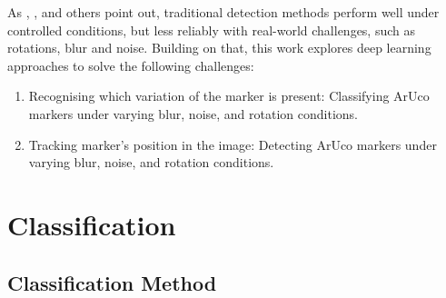 \documentclass[conference]{IEEEtran}
\begin{document}
As \textcite{FiducialMarkerNoisy}, \textcite{ROMERORAMIREZ2021104094}, and others point out, traditional detection methods perform well under controlled 
conditions, but less reliably with real-world challenges, such as rotations, blur and noise. Building on that, this work explores deep learning 
approaches to solve the following challenges:

\begin{enumerate}
  \item Recognising which variation of the marker is present: Classifying ArUco markers under varying blur, noise, and rotation conditions. 
  \item Tracking marker's position in the image: Detecting ArUco markers under varying blur, noise, and rotation conditions. 
\end{enumerate}

\section{Classification}

\subsection{Classification Method}
\end{document}
